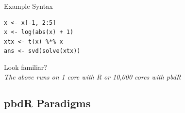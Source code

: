 \begin{frame}[fragile]
  \begin{block}{Example Syntax}\pause
  \begin{lstlisting}
x <- x[-1, 2:5]
x <- log(abs(x) + 1)
xtx <- t(x) %*% x
ans <- svd(solve(xtx))
  \end{lstlisting}
  \begin{center}
  \pause Look familiar?\\[.4cm] \pause
  \emph{The above runs on 1 core with R or 10,000 cores with pbdR}
  \end{center}
  \end{block}
\end{frame}



\subsection{pbdR Paradigms}



